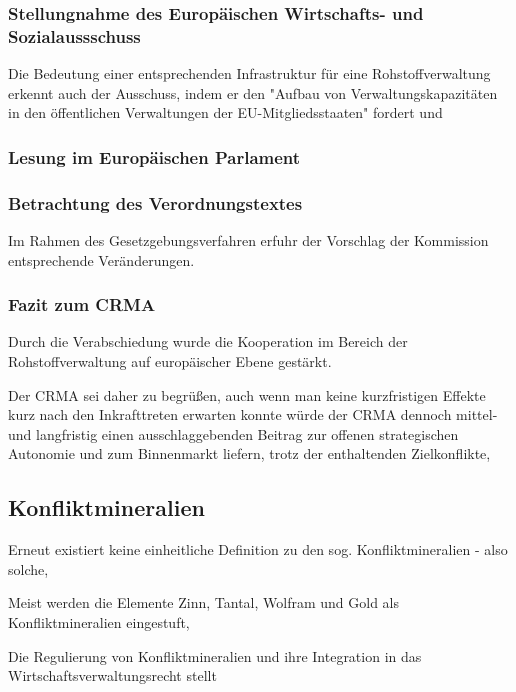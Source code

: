 \documentclass[12pt,a4paper,oneside]{book} %
\begin{document}
	\subsubsection{Stellungnahme des Europäischen Wirtschafts- und Sozialaussschuss}
	
	Die Bedeutung einer entsprechenden Infrastruktur für eine Rohstoffverwaltung erkennt auch der Ausschuss, indem er den "Aufbau von Verwaltungskapazitäten in den öffentlichen Verwaltungen der EU-Mitgliedsstaaten" fordert %
	und 
	
	\subsubsection{Lesung im Europäischen Parlament}
	
	
	\subsubsection{Betrachtung des Verordnungstextes}
	Im Rahmen des Gesetzgebungsverfahren erfuhr der Vorschlag der Kommission entsprechende Veränderungen.
	
	
	\subsubsection{Fazit zum CRMA}
	Durch die Verabschiedung wurde die Kooperation im Bereich der Rohstoffverwaltung auf europäischer Ebene gestärkt.
	
	Der CRMA sei daher zu begrüßen, auch wenn man keine kurzfristigen Effekte kurz nach den Inkrafttreten erwarten konnte würde der CRMA dennoch mittel- und langfristig einen ausschlaggebenden Beitrag zur offenen strategischen Autonomie und zum Binnenmarkt liefern, trotz der enthaltenden Zielkonflikte,\autocite{Schäffer/Hach, ZRP 2023, 210f.}
	
	
	\subsection{Konfliktmineralien}
	Erneut existiert keine einheitliche Definition zu den sog. Konfliktmineralien - also solche, 
	
	Meist werden die Elemente Zinn, Tantal, Wolfram und Gold als Konfliktmineralien eingestuft, 
	
	Die Regulierung von Konfliktmineralien und ihre Integration in das Wirtschaftsverwaltungsrecht stellt 
	
\end{document}
